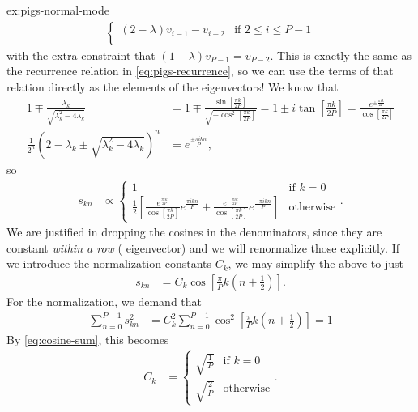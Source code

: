 \begin{DefAnswer}{ex:pigs-normal-mode}
\begin{align}
\begin{cases}
				(2 - \lambda) v_{i-1} - v_{i-2} & \text{if } 2 \le i \le P - 1 \\
			\end{cases}
	\end{align}
	with the extra constraint that $(1 - \lambda) v_{P-1} = v_{P-2}$.
	This is exactly the same as the recurrence relation in \cref{eq:pigs-recurrence}, so we can use the terms of that relation directly as the elements of the eigenvectors!
	We know that
	\begin{subequations}
	\begin{align}
		1 \mp \frac{\lambda_k}{\sqrt{\lambda_k^2 - 4 \lambda_k}}
		&= 1 \mp \frac{\sin{\left[ \frac{\pi k}{2 P} \right]}}{\sqrt{-\cos^2{\left[ \frac{\pi k}{2 P} \right]}}}
		= 1 \pm i \tan{\left[ \frac{\pi k}{2 P} \right]}
		= \frac{e^{\pm \frac{\pi i k}{2 P}}}{\cos{\left[ \frac{\pi k}{2 P} \right]}} \\
		\frac{1}{2^n} \left( 2 - \lambda_k \pm \sqrt{\lambda_k^2 - 4 \lambda_k} \right)^n
		&= e^{\frac{\pm \pi i k n}{P}},
	\end{align}
	\end{subequations}
	so
	\begin{align}
		s_{kn}
		&\propto \begin{cases}
				1 & \text{if } k = 0 \\
				\frac{1}{2} \left[
					\frac{e^{\frac{\pi i k}{2 P}}}{\cos{\left[ \frac{\pi k}{2 P} \right]}} e^{\frac{\pi i k n}{P}}
						+ \frac{e^{-\frac{\pi i k}{2 P}}}{\cos{\left[ \frac{\pi k}{2 P} \right]}} e^{\frac{-\pi i k n}{P}}
				\right] & \text{otherwise}
			\end{cases}.
	\end{align}
	We are justified in dropping the cosines in the denominators, since they are constant \emph{within a row} (\ie{} eigenvector) and we will renormalize those explicitly.
	If we introduce the normalization constants $C_k$, we may simplify the above to just
	\begin{align}
		s_{kn}
		&= C_k \cos{\left[ \frac{\pi}{P} k \left( n + \frac{1}{2} \right) \right]}.
			\label{eq:pigs-nm-transform}
	\end{align}
	For the normalization, we demand that
	\begin{align}
		\sum_{n=0}^{P-1} s_{kn}^2
		&= C_k^2 \sum_{n=0}^{P-1} \cos^2{\left[ \frac{\pi}{P} k \left( n + \frac{1}{2} \right) \right]}
		= 1
	\end{align}
	By \vref{eq:cosine-sum}, this becomes
	\begin{align}
		C_k
		&= \begin{cases}
				\sqrt{\frac{1}{P}} & \text{if } k = 0 \\
				\sqrt{\frac{2}{P}} & \text{otherwise}
			\end{cases}.
	\end{align}


\end{DefAnswer}
